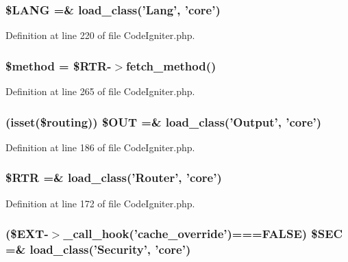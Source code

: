\subsubsection[{\$\-L\-A\-N\-G}]{\setlength{\rightskip}{0pt plus 5cm}\$L\-A\-N\-G =\& load\-\_\-class('Lang', 'core')}\label{_code_igniter_8php_afab4eb732acc05cebf41e0afce18681c}


Definition at line 220 of file Code\-Igniter.\-php.

\subsubsection[{\$method}]{\setlength{\rightskip}{0pt plus 5cm}\$method = \$R\-T\-R-\/$>$fetch\-\_\-method()}\label{_code_igniter_8php_a12661b2fc0f57f97e30a1620889ce9c6}


Definition at line 265 of file Code\-Igniter.\-php.

\subsubsection[{\$\-O\-U\-T}]{ (isset(\$routing)) \$O\-U\-T =\& load\-\_\-class('Output', 'core')}\label{_code_igniter_8php_a3f9ee241bf32c302b003449e028c859b}


Definition at line 186 of file Code\-Igniter.\-php.

\subsubsection[{\$\-R\-T\-R}]{\setlength{\rightskip}{0pt plus 5cm}\$R\-T\-R =\& load\-\_\-class('Router', 'core')}\label{_code_igniter_8php_a4d6c9285c8483e4708a57a4128fc95f3}


Definition at line 172 of file Code\-Igniter.\-php.

\subsubsection[{\$\-S\-E\-C}]{ (\${\bf E\-X\-T}-\/$>$\-\_\-call\-\_\-hook('cache\-\_\-override')===F\-A\-L\-S\-E) \$S\-E\-C =\& load\-\_\-class('Security', 'core')}\label{_code_igniter_8php_ad1366cae5e96fdde83a2fd6053334acd}


